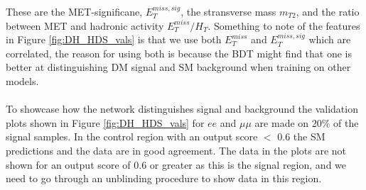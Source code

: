 \documentclass[12pt, a4paper]{book}
\begin{document}
These are the MET-significane, $E_T^{miss,sig}$, the stransverse mass $m_{T2}$, and the ratio between MET and hadronic activity $E_T^{miss}/H_T$. Something to note of the features in Figure \ref{fig:DH_HDS_vals} is that we use both $E_T^{miss}$ and $E_T^{miss,sig}$ which are correlated, the reason for using both is because the BDT 
might find that one is better at distinguishing DM signal and SM background when training on other models.\\
\\To showcase how the network distinguishes signal and background the validation plots shown in Figure \ref{fig:DH_HDS_vals} for $ee$ and $\mu\mu$ are made on 20\% of the signal samples. In the control region with an output score $<$ 0.6 the SM predictions and the data are in good agreement. The data in the plots are not shown for an output score of 0.6 or greater as this is the signal region, and 
we need to go through an unblinding procedure to show data in this region.\\
\end{document}
